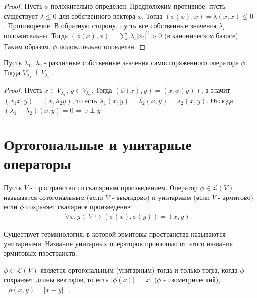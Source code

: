 \begin{proof}
    Пусть $\phi$ положительно определен. Предположим противное: пусть существует $\lambda \leq 0$ для собственного вектора $x$.
    Тогда $(\phi(x), x) = \lambda (x, x) \leq 0$. Противоречие.
    В обратную сторону, пусть все собственные значения $\lambda_i$ положительны. Тогда $(\phi(x), x) = \sum_{i} \lambda_i |x_i|^2 > 0$ (в каноническом базисе). Таким образом, $\phi$ положительно определен.
\end{proof}

\begin{proposition}
    Пусть $\lambda_1$, $\lambda_2$ - различные собственные значения самосопряженного оператора $\phi$.
    Тогда $V_{\lambda_1} \perp V_{\lambda_2}$.
\end{proposition}

\begin{proof}
    Пусть $x \in V_{\lambda_1}$, $y \in V_{\lambda_2}$. Тогда $(\phi(x), y) = (x, \phi(y))$, а значит $(\lambda_1 x, y) = (x, \lambda_2 y)$, то есть $\lambda_1 (x, y) = \overline{\lambda_2} (x, y) = 
    \lambda_2 (x, y)$. Отсюда $(\lambda_1 - \lambda_2)(x, y) = 0 \Mapsto x \perp y$
\end{proof}

\section{Ортогональные и унитарные операторы}

\begin{definition}
    Пусть $V$ - пространство со скалярным произведением. Оператор $\phi \in \mathcal{L}(V)$ называется ортогональным (если $V$ - евклидово) и унитарным (если $V$ - эрмитово) если $\phi$ сохраняет 
    скалярное произведение:
    \begin{gather*}
        \forall x, y \in V \hookrightarrow (\phi(x), \phi(y)) = (x, y).
    \end{gather*}
\end{definition}

\begin{note}
    Существует терминология, в которой эрмитовы пространства называются унитарными. Название унитарных операторов произошло от этого названия эрмитовых пространств.
\end{note}

\begin{proposition}
    $\phi \in \mathcal{L}(V)$ является ортогональным (унитарным) тогда и только тогда, когда $\phi$ сохраняет длины векторов, то есть $|\phi(x)| = |x|$ ($\phi$ - изометрический),$[\rho(x, y) = |x - y|]$.
\end{proposition}

